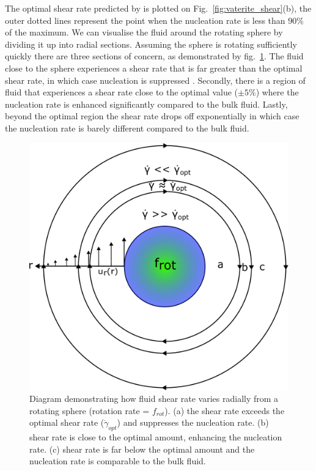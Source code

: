 The optimal shear rate predicted by \cite{Debuysschere2023} is 
plotted on Fig.~\ref{fig:vaterite_shear}(b), the outer dotted 
lines represent the point when the nucleation rate is less than 
90\% of the maximum. We can visualise the fluid around the 
rotating sphere by dividing it up into radial sections. Assuming 
the sphere is rotating sufficiently quickly there are three 
sections of concern, as demonstrated by fig.~\ref{fig:shear_diagram}. 
The fluid close to the sphere experiences a shear rate that 
is far greater than the optimal shear rate, in which case 
nucleation is suppressed \cite{Mura2016}. Secondly, there is 
a region of fluid that experiences a shear rate close to the 
optimal value ($\pm 5\%$) where the nucleation rate is enhanced 
significantly compared to the bulk fluid. Lastly, beyond the 
optimal region the shear rate drops off exponentially in which 
case the nucleation rate is barely different compared to the 
bulk fluid.
\begin{figure}[h!]
	\centering
	\includegraphics[width=0.875\linewidth]{shear_rate_diagram.pdf}
	\caption{Diagram demonstrating how fluid shear rate varies 
	radially from a rotating sphere (rotation rate = $f_{rot}$). 
	(a) the shear rate exceeds the optimal shear rate 
	($\dot{\gamma}_{opt}$) and suppresses the nucleation rate. 
	(b) shear rate is close to the optimal amount, enhancing the 
	nucleation rate. (c) shear rate is far below the optimal 
	amount and the nucleation rate is comparable to the bulk fluid.}
	\label{fig:shear_diagram}
\end{figure}

